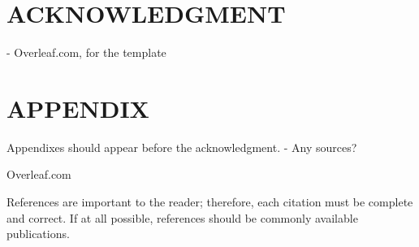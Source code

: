 \documentclass[letterpaper, 10 pt, conference]{ieeeconf}
\begin{document}

\section*{ACKNOWLEDGMENT}

- Overleaf.com, for the template







\section*{APPENDIX}

Appendixes should appear before the acknowledgment. 
\newline
\newline
- Any sources?

Overleaf.com

References are important to the reader; therefore, each citation must be complete and correct. If at all possible, references should be commonly available publications.
\end{document}
